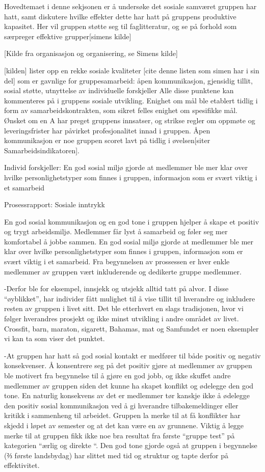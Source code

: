 
Hovedtemaet i denne sekjsonen er å undersøke det sosiale samværet gruppen har hatt, samt diskutere hvilke effekter dette har hatt på gruppens produktive kapasitet. Her vil gruppen støtte seg til faglitteratur, og se på forhold som særpreger effektive grupper[simens kilde]

[Kilde fra organisasjon og organisering, se Simens kilde]

[kilden] lister opp en rekke sosiale kvaliteter [cite denne listen som simen har i sin del] som er gavnlige for gruppesamarbeid:  åpen kommunikasjon, gjensidig tillit, sosial støtte, utnyttelse av individuelle forskjeller
Alle disse punktene kan kommenteres på i gruppens sosiale utvikling.
Enighet om mål ble etablert tidlig i form av samarbeidskontrakten, som sikret felles enighet om spesifikke mål. Ønsket om en A har preget gruppens innsatser, og strikse regler om oppmøte og leveringsfrister har påvirket profesjonalitet innad i gruppen. 
Åpen kommunikasjon er noe gruppen scoret lavt på tidlig i øvelsen[siter Samarbeidsindikatoren]. 


Individ forskjeller: En god sosial miljø gjorde at medlemmer ble mer klar over hvilke personlighetstyper som finnes i gruppen, informasjon som er svært viktig i et samarbeid



Prosessrapport: Sosiale inntrykk

En god sosial kommunikasjon og en god tone i gruppen hjelper å skape et positiv og trygt arbeidsmiljø. Medlemmer får lyst å samarbeid og føler seg mer komfortabel å jobbe sammen. En god sosial miljø gjorde at medlemmer ble mer klar over hvilke personlighetstyper som finnes i gruppen, informasjon som er svært viktig i et samarbeid. Fra begynnelsen av prossessen er hver enkle medlemmer av gruppen vært inkluderende og dedikerte gruppe medlemmer. 

-Derfor ble for eksempel, innsjekk og utsjekk alltid tatt på alvor. I disse “øyblikket”, har individer fått mulighet til å vise tillit til hverandre og inkludere resten av gruppen i livet sitt. 
Det ble etterhvert en slags tradisjonen, hvor vi følger hverandres prosjekt og ikke minst utvikling i andre området av livet. Crossfit, barn, maraton, sigarett, Bahamas, mat og Samfundet er noen eksempler vi kan ta som viser det punktet. 

-At gruppen har hatt så god sosial kontakt er medfører til både positiv og negativ konsekvenser. Å konsentrere seg på det positiv gjøre at medlemmer av gruppen ble motivert fra begynnelse til å gjøre en god jobb, og ikke skuffet andre medlemmer av gruppen siden det kunne ha skapet konflikt og ødelegge den god tone. En naturlig konsekvens av det er medlemmer tør kanskje ikke å ødelegge den positiv sosial kommunikasjon ved å gi hverandre tilbakemeldinger eller kritikk i sammenheng til arbeidet. Gruppen la merke til at få konflikter har skjedd i løpet av semester og at det kan være en av grunnene. Viktig å legge merke til at gruppen fikk ikke noe bra resultat fra første “gruppe test” på kategorien “ærlig og direkte “. Den god tone gjorde også at gruppen i begynnelse (⅔ første landsbydag)  har slittet med tid og struktur og tapte derfor på effektivitet. 

